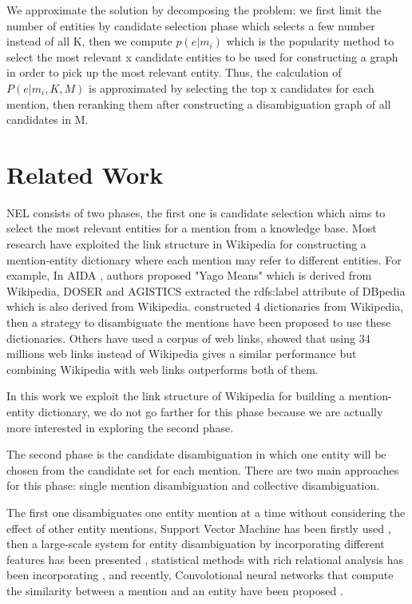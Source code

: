 \documentclass{llncs}
\begin{document}
We approximate the solution by decomposing the problem: we first limit the number of entities by candidate selection phase which selects a few number instead of all K, then we compute $p(e|m_{i})$ which is the popularity method to select the most relevant x candidate entities to be used for  constructing a graph  in order to pick up the most relevant entity. Thus, the calculation of  $ {P(e|m_{i},K,M)}$ is approximated by selecting the top x candidates for each mention, then reranking them after constructing a disambiguation graph of all candidates in M.

\section{Related Work}
NEL consists of two phases, the first one is candidate selection which aims to select the most relevant entities for a mention from a knowledge base. Most research have exploited the link structure  in Wikipedia for constructing a mention-entity dictionary where  each mention may refer to different entities. For example,   In AIDA \cite{hoffart_robust_2011}, authors proposed "Yago Means" which is   derived from Wikipedia,  DOSER \cite{zwicklbauer_doser_2016} and  AGISTICS \cite{usbeck_agdistis_2014}  extracted the rdfs:label attribute of DBpedia which is also derived from Wikipedia.  \cite{chang_comparison_2016} constructed 4 dictionaries  from Wikipedia, then a strategy to  disambiguate the mentions have been proposed  to use  these dictionaries.  Others have used a corpus of web links, \cite{chisholm_entity_2015} showed that using 34 millions web links instead of Wikipedia gives a similar performance but  combining Wikipedia with web links outperforms both of them. 

In this work we exploit the link structure of Wikipedia for building a mention-entity dictionary, we do not go farther for this phase because we are actually more interested in exploring the second phase.

The second phase is the candidate  disambiguation in which one entity will be chosen from the candidate set for each mention. There are two main approaches for this phase: single mention disambiguation and collective disambiguation. 

The first one disambiguates one entity mention at a time without considering the effect of other entity mentions, Support Vector Machine has been firstly used \cite{bunescu_using_2006}, then   a large-scale system for entity disambiguation by incorporating  different  features  has been presented \cite{cucerzan_large-scale_2007}, statistical methods with rich relational analysis has been incorporating \cite{cheng_relational_2013}, and recently, Convolotional neural networks  that compute the similarity between a mention and an entity have been proposed  \cite{francis-landau_capturing_2016}.
\end{document}
